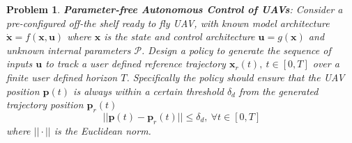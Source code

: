 \documentclass[letterpaper, 10 pt, conference]{ieeeconf}  %
\newtheorem{problem}{Problem}
\begin{document}
\begin{problem}
 \textbf{\textit{Parameter-free Autonomous Control of UAVs}}: 
Consider a pre-configured off-the shelf ready to fly UAV, with known model architecture $\dot{\bm{x}}=f(\bm{x},\bm{u})$ where $\bm{x}$ is the state and control architecture $\bm{u}=g(\bm{x})$ and unknown internal parameters $\mathcal{P}$. Design a policy to generate the sequence of inputs $\bm{u}$ to track a user defined reference trajectory $\bm{x}_r(t),~ t \in [0,T]$ over a finite user defined horizon $T$. Specifically the policy should ensure that the UAV position $\bm{p}(t)$ is always within a certain threshold $\delta_d$ from the generated trajectory position $\bm{p}_r(t)$
 \begin{equation} \label{eq:positlive}
        ||\bm{p}(t)-\bm{p}_r(t)|| \leq \delta_d,~\forall t \in [0,T]
    \end{equation}
    where $||\cdot||$ is the Euclidean norm.
\end{problem}
%
\end{document}
